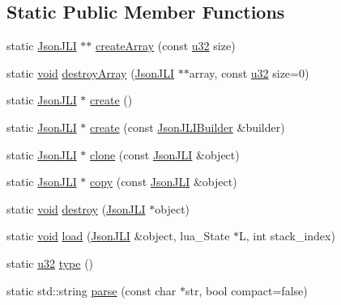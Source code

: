 \subsection*{Static Public Member Functions}
\begin{DoxyCompactItemize}
\item 
static \mbox{\hyperlink{classnjli_1_1_json_j_l_i}{Json\+J\+LI}} $\ast$$\ast$ \mbox{\hyperlink{classnjli_1_1_json_j_l_i_a4bb33dba5db29b43b5f98fd406ca83a4}{create\+Array}} (const \mbox{\hyperlink{_util_8h_a10e94b422ef0c20dcdec20d31a1f5049}{u32}} size)
\item 
static \mbox{\hyperlink{_thread_8h_af1e856da2e658414cb2456cb6f7ebc66}{void}} \mbox{\hyperlink{classnjli_1_1_json_j_l_i_aaca6b11677ffe08cd79ec975e4af8919}{destroy\+Array}} (\mbox{\hyperlink{classnjli_1_1_json_j_l_i}{Json\+J\+LI}} $\ast$$\ast$array, const \mbox{\hyperlink{_util_8h_a10e94b422ef0c20dcdec20d31a1f5049}{u32}} size=0)
\item 
static \mbox{\hyperlink{classnjli_1_1_json_j_l_i}{Json\+J\+LI}} $\ast$ \mbox{\hyperlink{classnjli_1_1_json_j_l_i_aa042d297050718c9c6f1d8f7a4eb42f6}{create}} ()
\item 
static \mbox{\hyperlink{classnjli_1_1_json_j_l_i}{Json\+J\+LI}} $\ast$ \mbox{\hyperlink{classnjli_1_1_json_j_l_i_a639dee21b688252f5e570cf46ad63713}{create}} (const \mbox{\hyperlink{classnjli_1_1_json_j_l_i_builder}{Json\+J\+L\+I\+Builder}} \&builder)
\item 
static \mbox{\hyperlink{classnjli_1_1_json_j_l_i}{Json\+J\+LI}} $\ast$ \mbox{\hyperlink{classnjli_1_1_json_j_l_i_a32601c2f880363f7e97de754258a007f}{clone}} (const \mbox{\hyperlink{classnjli_1_1_json_j_l_i}{Json\+J\+LI}} \&object)
\item 
static \mbox{\hyperlink{classnjli_1_1_json_j_l_i}{Json\+J\+LI}} $\ast$ \mbox{\hyperlink{classnjli_1_1_json_j_l_i_a2a4d8899495a335c9c734e090dbaf6b0}{copy}} (const \mbox{\hyperlink{classnjli_1_1_json_j_l_i}{Json\+J\+LI}} \&object)
\item 
static \mbox{\hyperlink{_thread_8h_af1e856da2e658414cb2456cb6f7ebc66}{void}} \mbox{\hyperlink{classnjli_1_1_json_j_l_i_aafaa3944f09a731934e5862c4fdea495}{destroy}} (\mbox{\hyperlink{classnjli_1_1_json_j_l_i}{Json\+J\+LI}} $\ast$object)
\item 
static \mbox{\hyperlink{_thread_8h_af1e856da2e658414cb2456cb6f7ebc66}{void}} \mbox{\hyperlink{classnjli_1_1_json_j_l_i_a3676a4453fa514678f700cb98e915852}{load}} (\mbox{\hyperlink{classnjli_1_1_json_j_l_i}{Json\+J\+LI}} \&object, lua\+\_\+\+State $\ast$L, int stack\+\_\+index)
\item 
static \mbox{\hyperlink{_util_8h_a10e94b422ef0c20dcdec20d31a1f5049}{u32}} \mbox{\hyperlink{classnjli_1_1_json_j_l_i_a5c600e1e7f959c4e277196f73880f224}{type}} ()
\item 
static std\+::string \mbox{\hyperlink{classnjli_1_1_json_j_l_i_acad2f27febb63dd99601b1835958b839}{parse}} (const char $\ast$str, bool compact=false)
\end{DoxyCompactItemize}
